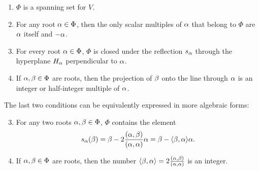 \documentclass[12pt,reqno,oneside]{amsart}
\begin{document}
        \begin{enumerate}[label=(\roman*)]
            \item $\Phi$ is a spanning set for $V$.
            \item For any root $\alpha \in \Phi$, then the only scalar multiples of $\alpha$ that belong to $\Phi$ are $\alpha$ itself and $-\alpha$.
            \item For every root $\alpha \in \Phi$, $\Phi$ is closed under the reflection $s_{\alpha}$ through the hyperplane $H_{\alpha}$ perpendicular to $\alpha$.
            \item If $\alpha,\beta \in \Phi$ are roots, then the projection of $\beta$ onto the line through $\alpha$ is an integer or half-integer multiple of $\alpha$.
        \end{enumerate}

        The last two conditions can be equivalently expressed in more algebraic forms:

        \begin{enumerate}[label=(\roman*)]
            \setcounter{enumi}{2}
            \item For any two roots $\alpha,\beta \in \Phi$, $\Phi$ contains the element
            \[
                s_{\alpha}(\beta) = \beta-2\frac{(\alpha,\beta)}{(\alpha,\alpha)}\alpha = \beta-\langle\beta,\alpha\rangle\alpha.
            \]
            \item If $\alpha,\beta \in \Phi$ are roots, then the number $\langle\beta,\alpha\rangle = 2\frac{(\alpha,\beta)}{(\alpha,\alpha)}$ is an integer.
        \end{enumerate}
        
\end{document}
